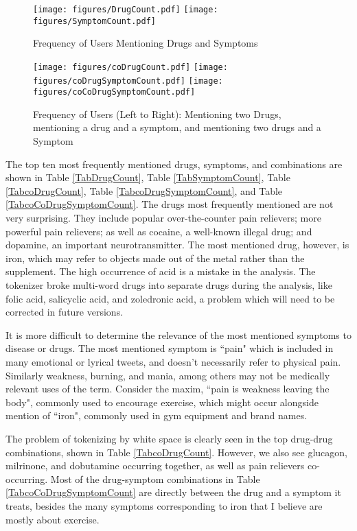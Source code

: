\documentclass[letterpaper]{article}
\begin{document}
\begin{figure}
\centering
\texttt{[image: figures/DrugCount.pdf]}
\texttt{[image: figures/SymptomCount.pdf]}

\caption{\label{DrugAndSymptomCounts} Frequency of Users Mentioning Drugs and Symptoms}
\end{figure}

\begin{figure}
\centering
\texttt{[image: figures/coDrugCount.pdf]}
\texttt{[image: figures/coDrugSymptomCount.pdf]}
\texttt{[image: figures/coCoDrugSymptomCount.pdf]}

\caption{\label{CoCounts} Frequency of Users (Left to Right): Mentioning two Drugs, mentioning a drug and a symptom, and mentioning two drugs and a Symptom}
\end{figure}

The top ten most frequently mentioned drugs, symptoms, and combinations are shown in Table \ref{TabDrugCount}, Table \ref{TabSymptomCount}, Table \ref{TabcoDrugCount}, Table \ref{TabcoDrugSymptomCount}, and Table \ref{TabcoCoDrugSymptomCount}. The drugs most frequently mentioned are not very surprising. They include popular over-the-counter pain relievers; more powerful pain relievers; as well as cocaine, a well-known illegal drug; and dopamine, an important neurotransmitter. The most mentioned drug, however, is iron, which may refer to objects made out of the metal rather than the supplement. The high occurrence of acid is a mistake in the analysis. The tokenizer broke multi-word drugs into separate drugs during the analysis, like folic acid, salicyclic acid, and zoledronic acid, a problem which will need to be corrected in future versions.

It is more difficult to determine the relevance of the most mentioned symptoms to disease or drugs. The most mentioned symptom is ``pain" which is included in many emotional or lyrical tweets, and doesn't necessarily refer to physical pain. Similarly weakness, burning, and mania, among others may not be medically relevant uses of the term. Consider the maxim, ``pain is weakness leaving the body", commonly used to encourage exercise, which might occur alongside mention of ``iron", commonly used in gym equipment and brand names.

The problem of tokenizing by white space is clearly seen in the top drug-drug combinations, shown in Table \ref{TabcoDrugCount}. However, we also see glucagon, milrinone, and dobutamine occurring together, as well as pain relievers co-occurring. Most of the drug-symptom combinations in Table \ref{TabcoCoDrugSymptomCount} are directly between the drug and a symptom it treats, besides the many symptoms corresponding to iron that I believe are mostly about exercise. 
\end{document}
